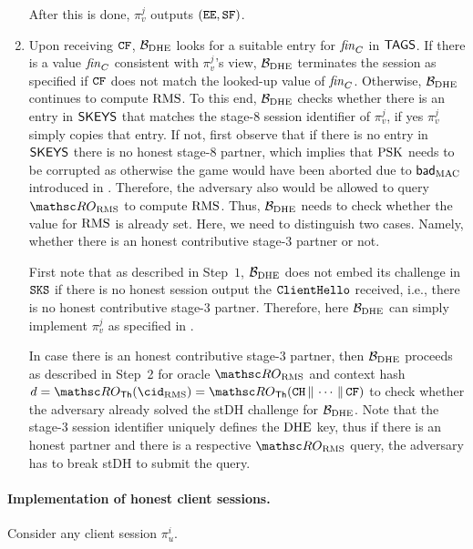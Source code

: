 \begin{enumerate}
		After this is done, $\pi_v^j$ outputs $(\mathtt{EE}, \mathtt{SF})$.
		\item Upon receiving $\mathtt{CF}$, $\mathcal{B}_{\mathrm{DHE}}$ looks for a suitable entry for $\mathit{fin}_C$ in $\mathsf{TAGS}$.
		If there is a value $\mathit{fin}_C$ consistent with $\pi_v^j$'s view, $\mathcal{B}_{\mathrm{DHE}}$ terminates the session as specified if $\mathtt{CF}$ does not match the looked-up value of $\mathit{fin}_C$.
		Otherwise, $\mathcal{B}_{\mathrm{DHE}}$ continues to compute $\mathrm{RMS}$.
		To this end, $\mathcal{B}_{\mathrm{DHE}}$ checks whether there is an entry in $\mathsf{SKEYS}$ that matches the stage-$8$ session identifier of $\pi_v^j$, if yes $\pi_v^j$ simply copies that entry.
		If not, first observe that if there is no entry in $\mathsf{SKEYS}$ there is no honest stage-$8$ partner, which implies that $\mathrm{PSK}$ needs to be corrupted as otherwise the game would have been aborted due to $\mathsf{bad}_{\mathrm{MAC}}$ introduced in .
		Therefore, the adversary also would be allowed to query $\RO_\rms$ to compute $\mathrm{RMS}$.
		Thus, $\mathcal{B}_{\mathrm{DHE}}$ needs to check whether the value for $\mathrm{RMS}$ is already set.
		Here, we need to distinguish two cases.
		Namely, whether there is an honest contributive stage-$3$ partner or not.
		
		First note that as described in Step~$1$, $\mathcal{B}_{\mathrm{DHE}}$ does not embed its challenge in $\mathtt{SKS}$ if there is no honest session output the $\mathtt{ClientHello}$ received, i.e., there is no honest contributive stage-$3$ partner.
		Therefore, here $\mathcal{B}_{\mathrm{DHE}}$ can simply implement $\pi_v^j$ as specified in \thisGame.
		
		In case there is an honest contributive stage-$3$ partner, then $\mathcal{B}_{\mathrm{DHE}}$ proceeds as described in Step~2 for oracle $\RO_\rms$ and context hash $d = \RO_\Thash(\cid_\rms) = \RO_\Thash(\CH \concat \dotsb \concat \CF)$ to check whether the adversary already solved the stDH challenge for $\mathcal{B}_{\mathrm{DHE}}$.
		Note that the stage-$3$ session identifier uniquely defines the $\mathrm{DHE}$ key, thus if there is an honest partner and there is a respective $\RO_\rms$ query, the adversary has to break stDH to submit the query.
	\end{enumerate}
	
	\paragraph{Implementation of honest client sessions.}
	Consider any client session $\pi_u^i$.
	
